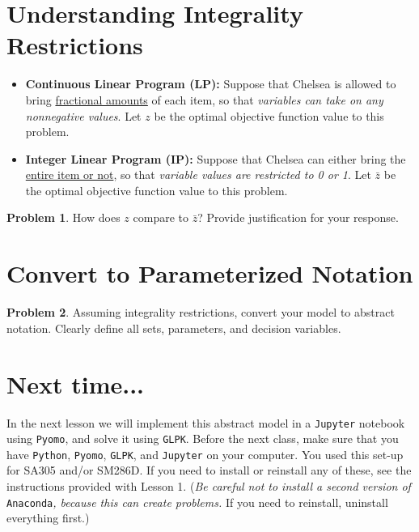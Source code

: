 \documentclass[12pt]{article}
\theoremstyle{definition}
\newtheorem{problem}{Problem}
\begin{document}
\vfill

\section{Understanding Integrality Restrictions}
\begin{itemize}
\item \textbf{Continuous Linear Program (LP):}  Suppose that Chelsea is allowed to bring \underline{fractional amounts} of each item, so that \emph{variables can take on any nonnegative values}. Let $z$ be the optimal objective function value to this problem.

\item \textbf{Integer Linear Program (IP):} Suppose that Chelsea can either bring the \underline{entire item or not}, so that \emph{variable values are restricted to  0 or 1}. Let $\bar{z}$ be the optimal objective function value to this problem.
\end{itemize}
\begin{problem} How does $z$ compare to $\bar{z}$? Provide justification for your response. \end{problem}

\vfill

\pagebreak
\section{Convert to Parameterized Notation}
\begin{problem}
Assuming integrality restrictions, convert your model to abstract notation.  Clearly define all sets, parameters, and decision variables. \\
\end{problem}

\vskip 15cm
\section{Next time...}
In the next lesson we will implement this abstract model in a \texttt{Jupyter} notebook using \texttt{Pyomo}, and solve it using \texttt{GLPK}.  Before the next class, make sure that you have \texttt{Python}, \texttt{Pyomo}, \texttt{GLPK}, and \texttt{Jupyter} on your computer.  You used this set-up for SA305 and/or SM286D.  If you need to install or reinstall any of these, see the instructions provided with Lesson 1.  (\emph{Be careful not to install a second version of} \texttt{Anaconda}\emph{, because this can create problems.}  If you need to reinstall, uninstall everything first.)
\end{document}
